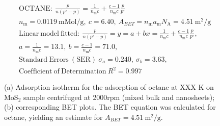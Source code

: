 

\begin{align*}
&\mathrm{OCTANE:}\ \frac{p}{n(p^\circ-p)}=\frac{1}{n_\mathrm{m}c}+\frac{c-1}{n_\mathrm{m}c}\frac{p}{p^\circ}\\
&{n_\mathrm{m}}=0.0119\ \mathrm{mMol/g},\ c=6.40,\ A_{BET}={n_\mathrm{m}}{a_\mathrm{m}}{N_\mathrm{A}}=4.51\ \mathrm{m}^2\mathrm{/g}\\
&\mathrm{Linear\ model\ fitted:}\ \frac{p}{n(p^\circ-p)}=y=a+bx=\frac{1}{n_\mathrm{m}c}+\frac{c-1}{n_\mathrm{m}c}\frac{p}{p^\circ},\\
&a=\frac{1}{n_\mathrm{m}c}=13.1,\ b=\frac{c-1}{n_\mathrm{m}c}=71.0,\\
&\mathrm{Standard\ Errors\ (SER)}\ \sigma_a=0.240,\ \sigma_b=3.63,\\
&\mathrm{Coefficient\ of\ Determination}\ R^2 = 0.997
\end{align*}


\begin{figure}[htb]
\hfill
{}
\caption{(a) Adsorption isotherm for the adsorption of octane at XXX K on MoS$_2$ 
sample centrifuged at 2000rpm (mixed bulk and nanosheets);
(b) corresponding BET plots. The BET equation was calculated for octane, yielding an estimate for $A_{BET}=4.51\ \mathrm{m}^2\mathrm{/g}$.}

\label{fig:sa-Reference-As-Supplied-100mg-3mm-50C-S1-SE-10ml}
\end{figure}


